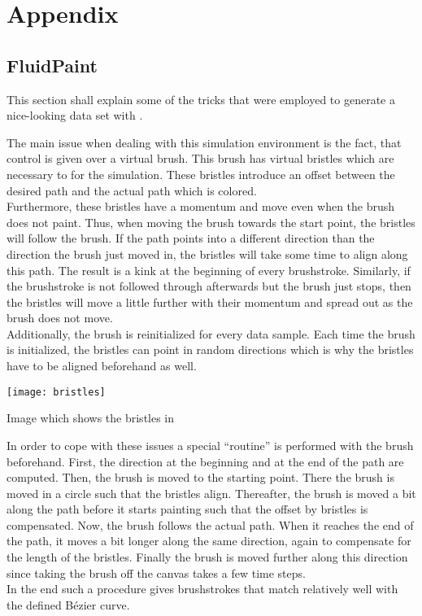 \setchapterpreamble[u]{\margintoc}
\chapter{Appendix}
\section{FluidPaint}
This section shall explain some of the tricks that were employed to generate a nice-looking data set with .

The main issue when dealing with this simulation environment is the fact, that control is given over a virtual brush.
This brush has virtual bristles which are necessary to for the simulation.
These bristles introduce an offset between the desired path and the actual path which is colored.\\
Furthermore, these bristles have a momentum and move even when the brush does not paint.
Thus, when moving the brush towards the start point, the bristles will follow the brush.
If the path points into a different direction than the direction the brush just moved in, the bristles will take some time to align along this path.
The result is a kink at the beginning of every brushstroke.
Similarly, if the brushstroke is not followed through afterwards but the brush just stops, then the bristles will move a little further with their momentum and spread out as the brush does not move.\\
Additionally, the brush is reinitialized for every data sample.
Each time the brush is initialized, the bristles can point in random directions which is why the bristles have to be aligned beforehand as well.
\begin{marginfigure}
    \texttt{[image: bristles]}
    \caption[]{Image which shows the bristles in ~\cite{fluidpaint}}
\end{marginfigure}

In order to cope with these issues a special ``routine'' is performed with the brush beforehand.
First, the direction at the beginning and at the end of the path are computed.
Then, the brush is moved to the starting point.
There the brush is moved in a circle such that the bristles align.
Thereafter, the brush is moved a bit along the path before it starts painting such that the offset by bristles is compensated.
Now, the brush follows the actual path.
When it reaches the end of the path, it moves a bit longer along the same direction, again to compensate for the length of the bristles.
Finally the brush is moved further along this direction since taking the brush off the canvas takes a few time steps.\\
In the end such a procedure gives brushstrokes that match relatively well with the defined Bézier curve.

